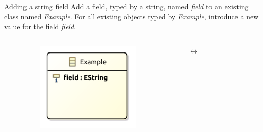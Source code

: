 
\begin{frame}{Adding a string field}
Add a field, typed by a string, named \textit{field} to an existing class named \textit{Example}. For all existing objects typed by \textit{Example}, introduce a new value for the field \textit{field}.
\begin{columns}[c]
    \begin{column}{0.05\textwidth}
    \end{column}\begin{column}{0.45\textwidth}
        \centering
        \includegraphics[width=0.7\textwidth]{images/04_library_of_transformations/data_field.pdf}
    \end{column}\begin{column}{0.05\textwidth}
        \centering
        $\leftrightarrow$
    \end{column}\begin{column}{0.45\textwidth}
        \centering
        
    \end{column}
\end{columns}
\begin{columns}[c]
    \begin{column}{0.05\textwidth}
    \end{column}\begin{column}{0.45\textwidth}

\end{column}
\end{columns}
\end{frame}
